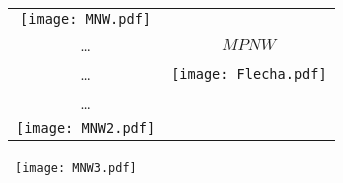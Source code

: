 \documentclass[border=5pt]{standalone}
\begin{document}
\begin{tabular}{|c|c}\cline{1-1}
   \texttt{[image: MNW.pdf]} & \\
   \ldots & {\tiny $MPNW$} \\
   \ldots & \texttt{[image: Flecha.pdf]} \\
   \ldots & \\
   \texttt{[image: MNW2.pdf]} & \\\cline{1-1}
\end{tabular}
\begin{minipage}{100pt}
   \mbox{ \texttt{[image: MNW3.pdf]} }
\end{minipage}
\end{document}
